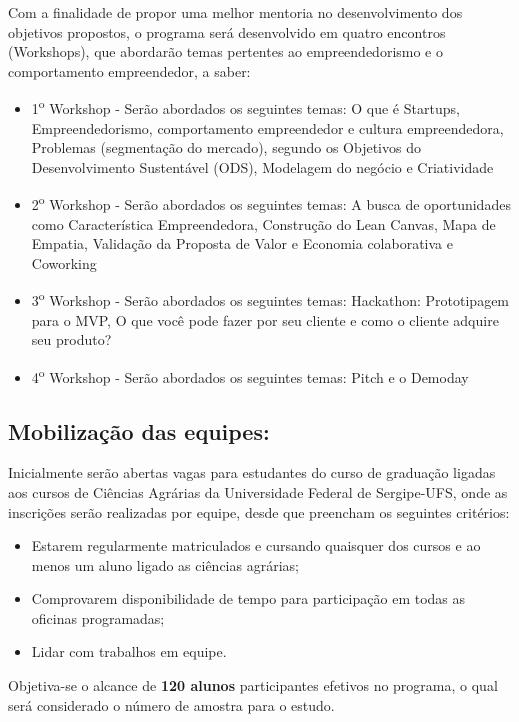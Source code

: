 Com a finalidade de propor uma melhor mentoria no desenvolvimento dos objetivos propostos, o programa será desenvolvido em quatro encontros (Workshops), que abordarão temas pertentes ao empreendedorismo e o comportamento empreendedor, a saber:

\begin{itemize}
\item{1\textsuperscript{o} Workshop - Serão abordados os seguintes temas: O que é Startups, Empreendedorismo, comportamento empreendedor e cultura empreendedora, Problemas (segmentação do mercado), segundo os Objetivos do Desenvolvimento Sustentável (ODS), Modelagem do negócio e Criatividade}

\item{2\textsuperscript{o} Workshop - Serão abordados os seguintes temas: A busca de oportunidades como Característica Empreendedora, Construção do Lean Canvas, Mapa de Empatia, Validação da Proposta de Valor e Economia colaborativa e Coworking}
\item{3\textsuperscript{o} Workshop - Serão abordados os seguintes temas: Hackathon: Prototipagem para o MVP, O que você pode fazer por seu cliente e como o cliente adquire seu produto?}
\item{4\textsuperscript{o} Workshop - Serão abordados os seguintes temas: Pitch e o Demoday}

\end{itemize}

\subsection{Mobilização das equipes:}

Inicialmente serão abertas vagas para estudantes do curso de graduação ligadas aos cursos de Ciências Agrárias da Universidade Federal de Sergipe-UFS, onde as inscrições serão realizadas por equipe, desde que preencham os seguintes critérios:

	
\begin{itemize}
\item{Estarem regularmente matriculados e cursando quaisquer dos cursos e ao menos um aluno ligado as ciências agrárias;}
\item{Comprovarem disponibilidade de tempo para participação em todas as oficinas programadas;}
\item{Lidar com trabalhos em equipe.}
\end{itemize}

Objetiva-se o alcance de \textbf{120 alunos} participantes efetivos no programa, o qual será considerado o número de amostra para o estudo. 

